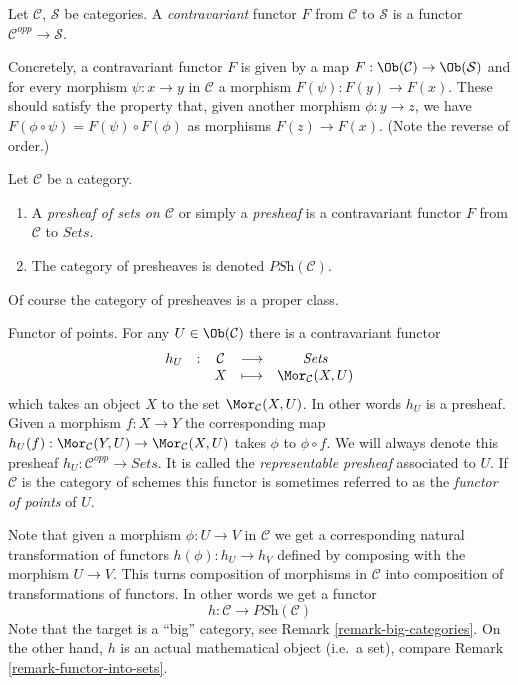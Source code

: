 \begin{definition}
\label{definition-contravariant}
Let $\mathcal{C}$, $\mathcal{S}$ be categories.
A {\it contravariant} functor $F$
from $\mathcal{C}$ to $\mathcal{S}$
is a functor $\mathcal{C}^{opp}\to \mathcal{S}$.
\end{definition}

\noindent
Concretely, a contravariant functor $F$ is given
by a map $F : \Ob(\mathcal{C}) \to
\Ob(\mathcal{S})$ and for every morphism
$\psi : x \to y$ in $\mathcal{C}$ a morphism
$F(\psi) : F(y) \to F(x)$. These should satisfy the property
that, given another morphism
$\phi : y \to z$, we have $F(\phi \circ \psi)
= F(\psi) \circ F(\phi)$ as morphisms $F(z) \to F(x)$.
(Note the reverse of order.)

\begin{definition}
\label{definition-presheaf}
Let $\mathcal{C}$ be a category.
\begin{enumerate}
\item A {\it presheaf of sets on $\mathcal{C}$}
or simply a {\it presheaf} is a contravariant functor
$F$ from $\mathcal{C}$ to $\textit{Sets}$.
\item The category of presheaves is denoted $\textit{PSh}(\mathcal{C})$.
\end{enumerate}
\end{definition}

\noindent
Of course the category of presheaves is a proper class.

\begin{example}
\label{example-hom-functor}
Functor of points.
For any $U\in \Ob(\mathcal{C})$ there is a contravariant
functor
$$
\begin{matrix}
h_U & : & \mathcal{C}
&
\longrightarrow
&
\textit{Sets} \\
& &
X
&
\longmapsto
&
\Mor_\mathcal{C}(X, U)
\end{matrix}
$$
which takes an object $X$ to the set
$\Mor_\mathcal{C}(X, U)$. In other words $h_U$ is a presheaf.
Given a morphism $f : X\to Y$ the corresponding map
$h_U(f) :  \Mor_\mathcal{C}(Y, U)\to \Mor_\mathcal{C}(X, U)$
takes $\phi$ to $\phi\circ f$. We will always denote
this presheaf $h_U : \mathcal{C}^{opp} \to \textit{Sets}$.
It is called the {\it representable presheaf} associated to $U$.
If $\mathcal{C}$ is the category of schemes this functor is
sometimes referred to as the
\emph{functor of points} of $U$.
\end{example}

\noindent
Note that given a morphism $\phi : U \to V$ in $\mathcal{C}$ we get a
corresponding natural transformation of functors $h(\phi) : h_U \to h_V$
defined by composing with the morphism $U \to V$. This turns
composition of morphisms in $\mathcal{C}$ into composition of
transformations of functors. In other words we get a functor
$$
h :
\mathcal{C}
\longrightarrow
\textit{PSh}(\mathcal{C})
$$
Note that the target is a ``big'' category, see
Remark \ref{remark-big-categories}. On the other hand,
$h$ is an actual mathematical object (i.e.\ a set), compare Remark
\ref{remark-functor-into-sets}.

